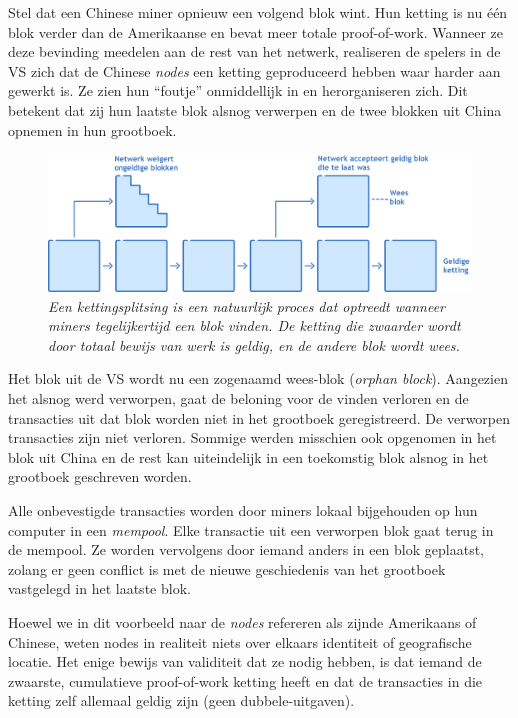 Stel dat een Chinese miner opnieuw een volgend blok wint. Hun ketting is nu één blok verder dan de Amerikaanse en bevat meer totale proof-of-work. Wanneer ze deze bevinding meedelen aan de rest van het netwerk, realiseren de spelers in de VS zich dat de Chinese \textit{nodes} een ketting geproduceerd hebben waar harder aan gewerkt is. Ze zien hun “foutje” onmiddellijk in en herorganiseren zich. Dit betekent dat zij hun laatste blok alsnog verwerpen en de twee blokken uit China opnemen in hun grootboek.

\begin{figure}[h]
    \centering
    \includegraphics[width=\textwidth]{images/fig12.png}
    \caption{\footnotesize{\textit{Een kettingsplitsing is een natuurlijk proces dat optreedt wanneer miners tegelijkertijd een blok vinden. De ketting die zwaarder wordt door totaal bewijs van werk is geldig, en de andere blok wordt wees.}}}
    \label{fig12}
\end{figure}



Het blok uit de VS wordt nu een zogenaamd wees-blok (\textit{orphan block}). Aangezien het alsnog werd verworpen, gaat de beloning voor de vinden verloren en de transacties uit dat blok worden niet in het grootboek geregistreerd. De verworpen transacties zijn niet verloren. Sommige werden misschien ook opgenomen in het blok uit China en de rest kan uiteindelijk in een toekomstig blok alsnog in het grootboek geschreven worden.

Alle onbevestigde transacties worden door miners lokaal bijgehouden op hun computer in een \textit{mempool}. Elke transactie uit een verworpen blok gaat terug in de mempool. Ze worden vervolgens door iemand anders in een blok geplaatst, zolang er geen conflict is met de nieuwe geschiedenis van het grootboek vastgelegd in het laatste blok.

Hoewel we in dit voorbeeld naar de \textit{nodes} refereren als zijnde Amerikaans of Chinese, weten nodes in realiteit niets over elkaars identiteit of geografische locatie. Het enige bewijs van validiteit dat ze nodig hebben, is dat iemand de zwaarste, cumulatieve proof-of-work ketting heeft en dat de transacties in die ketting zelf allemaal geldig zijn (geen dubbele-uitgaven).

